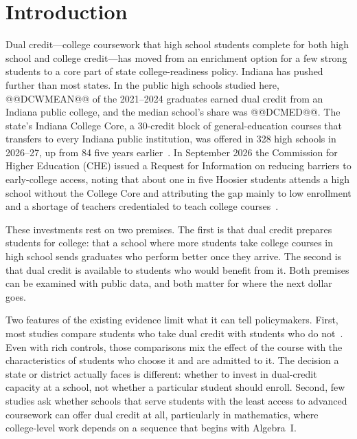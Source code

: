 \documentclass[aps,prd,reprint,superscriptaddress,nofootinbib,floatfix]{revtex4-2}
\begin{document}
\maketitle

\section{Introduction}\label{sec:intro}

Dual credit---college coursework that high school students complete for both high school and college credit---has moved from an enrichment option for a few strong students to a core part of state college-readiness policy. Indiana has pushed further than most states. In the public high schools studied here, @@DCWMEAN@@ of the 2021--2024 graduates earned dual credit from an Indiana public college, and the median school's share was @@DCMED@@. The state's Indiana College Core, a 30-credit block of general-education courses that transfers to every Indiana public institution, was offered in 328 high schools in 2026--27, up from 84 five years earlier~\cite{cherelease}. In September 2026 the Commission for Higher Education (CHE) issued a Request for Information on reducing barriers to early-college access, noting that about one in five Hoosier students attends a high school without the College Core and attributing the gap mainly to low enrollment and a shortage of teachers credentialed to teach college courses~\cite{icc}.

These investments rest on two premises. The first is that dual credit prepares students for college: that a school where more students take college courses in high school sends graduates who perform better once they arrive. The second is that dual credit is available to students who would benefit from it. Both premises can be examined with public data, and both matter for where the next dollar goes.

Two features of the existing evidence limit what it can tell policymakers. First, most studies compare students who take dual credit with students who do not~\cite{an2013,karp2007,speroni2011,giani2014}. Even with rich controls, those comparisons mix the effect of the course with the characteristics of students who choose it and are admitted to it. The decision a state or district actually faces is different: whether to invest in dual-credit capacity at a school, not whether a particular student should enroll. Second, few studies ask whether schools that serve students with the least access to advanced coursework can offer dual credit at all, particularly in mathematics, where college-level work depends on a sequence that begins with Algebra~I.
\end{document}
